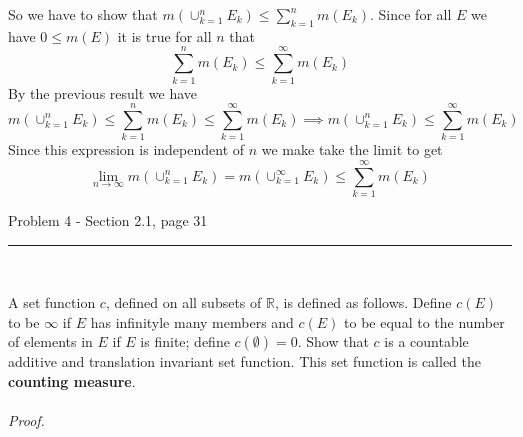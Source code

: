\documentclass[11pt,reqno]{article}
\begin{document}
So we have to show that $m(\cup^n_{k=1} E_k) \le \sum^n_{k = 1} m(E_k)$. Since for all $E$ we have $0 \le m( E)$ it is true for all $n$ that
\[ \sum^n_{k=1} m(E_k) \le \sum^\infty_{k = 1} m(E_k) \]
By the previous result we have 
\[ m(\cup^{n}_{k=1} E_k) \le \sum^n_{k=1} m(E_k) \le \sum^\infty_{k = 1} m(E_k) \implies m(\cup^{n}_{k=1} E_k) \le \sum^\infty_{k = 1} m(E_k)\]
Since this expression is independent of $n$ we make take the limit to get 
\[\lim_{n \to \infty} m(\cup^{n}_{k=1} E_k) = m(\cup^{\infty}_{k=1} E_k) \le \sum^\infty_{k = 1} m(E_k) \]


\begin{flushleft} 
Problem 4 - Section 2.1, page 31\\
\rule{500pt}{1pt}\\
\end{flushleft} 

A set function $c$, defined on all subsets of $\mathbb{R}$, is defined as follows. Define $c(E)$ to be $\infty$ if $E$ has infinityle many members and $c(E)$ to be equal to the number of elements in $E$ if $E$ is finite; define $c(\emptyset) = 0$. Show that $c$ is a countable additive and translation invariant set function. This set function is called the \textbf{counting measure}.
\\\\ \emph{Proof.}
\end{document}
